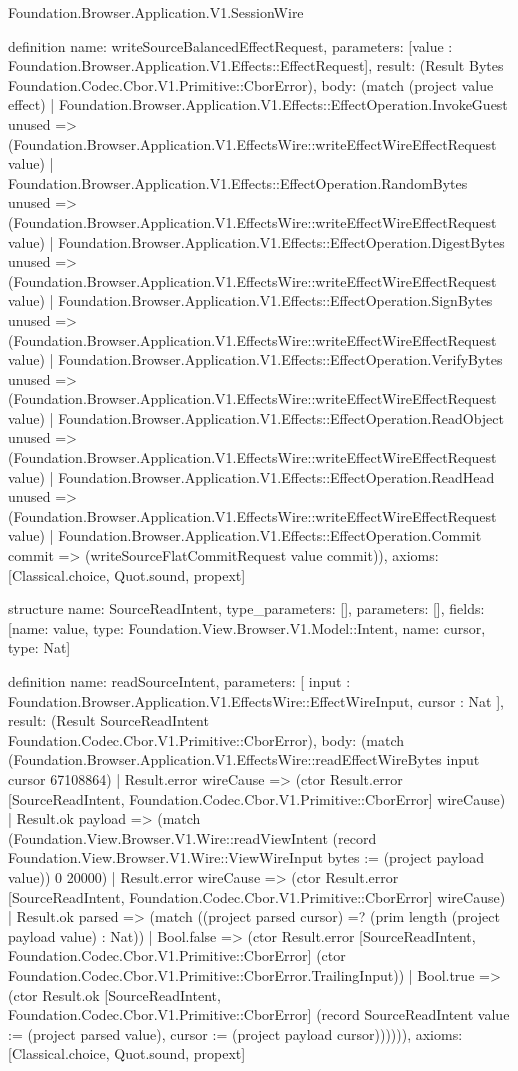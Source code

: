 \begin{lexlean}{Foundation.Browser.Application.V1.SessionWire}
\begin{semanticmodule}
definition{
  name: writeSourceBalancedEffectRequest,
  parameters: [value : Foundation.Browser.Application.V1.Effects::EffectRequest],
  result: (Result Bytes Foundation.Codec.Cbor.V1.Primitive::CborError),
  body: (match (project value effect)
    | Foundation.Browser.Application.V1.Effects::EffectOperation.InvokeGuest unused => (Foundation.Browser.Application.V1.EffectsWire::writeEffectWireEffectRequest value)
    | Foundation.Browser.Application.V1.Effects::EffectOperation.RandomBytes unused => (Foundation.Browser.Application.V1.EffectsWire::writeEffectWireEffectRequest value)
    | Foundation.Browser.Application.V1.Effects::EffectOperation.DigestBytes unused => (Foundation.Browser.Application.V1.EffectsWire::writeEffectWireEffectRequest value)
    | Foundation.Browser.Application.V1.Effects::EffectOperation.SignBytes unused => (Foundation.Browser.Application.V1.EffectsWire::writeEffectWireEffectRequest value)
    | Foundation.Browser.Application.V1.Effects::EffectOperation.VerifyBytes unused => (Foundation.Browser.Application.V1.EffectsWire::writeEffectWireEffectRequest value)
    | Foundation.Browser.Application.V1.Effects::EffectOperation.ReadObject unused => (Foundation.Browser.Application.V1.EffectsWire::writeEffectWireEffectRequest value)
    | Foundation.Browser.Application.V1.Effects::EffectOperation.ReadHead unused => (Foundation.Browser.Application.V1.EffectsWire::writeEffectWireEffectRequest value)
    | Foundation.Browser.Application.V1.Effects::EffectOperation.Commit commit => (writeSourceFlatCommitRequest value commit)),
  axioms: [Classical.choice, Quot.sound, propext]
}

structure{
  name: SourceReadIntent,
  type_parameters: [],
  parameters: [],
  fields: [{name: value, type: Foundation.View.Browser.V1.Model::Intent}, {name: cursor, type: Nat}]
}

definition{
  name: readSourceIntent,
  parameters: [
    input : Foundation.Browser.Application.V1.EffectsWire::EffectWireInput,
    cursor : Nat
  ],
  result: (Result SourceReadIntent Foundation.Codec.Cbor.V1.Primitive::CborError),
  body: (match (Foundation.Browser.Application.V1.EffectsWire::readEffectWireBytes input cursor 67108864)
    | Result.error wireCause => (ctor Result.error [SourceReadIntent, Foundation.Codec.Cbor.V1.Primitive::CborError] wireCause)
    | Result.ok payload => (match (Foundation.View.Browser.V1.Wire::readViewIntent (record Foundation.View.Browser.V1.Wire::ViewWireInput {bytes := (project payload value)}) 0 20000)
      | Result.error wireCause => (ctor Result.error [SourceReadIntent, Foundation.Codec.Cbor.V1.Primitive::CborError] wireCause)
      | Result.ok parsed => (match ((project parsed cursor) =? (prim length (project payload value) : Nat))
        | Bool.false => (ctor Result.error [SourceReadIntent, Foundation.Codec.Cbor.V1.Primitive::CborError] (ctor Foundation.Codec.Cbor.V1.Primitive::CborError.TrailingInput))
        | Bool.true => (ctor Result.ok [SourceReadIntent, Foundation.Codec.Cbor.V1.Primitive::CborError] (record SourceReadIntent {value := (project parsed value), cursor := (project payload cursor)}))))),
  axioms: [Classical.choice, Quot.sound, propext]
}


\end{semanticmodule}
\end{lexlean}
